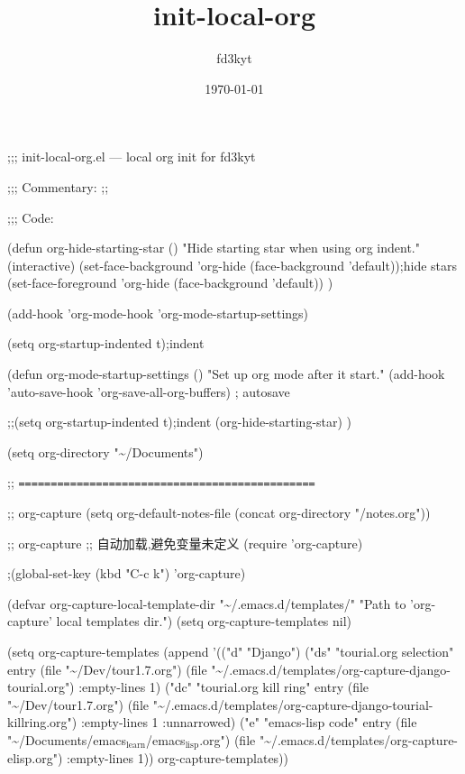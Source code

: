 \documentclass[11pt]{article}
\author{fd3kyt}
\date{\today}
\title{init-local-org}
\begin{document}
\maketitle
\tableofcontents

;;; init-local-org.el --- local org init for fd3kyt

;;; Commentary:
;;


;;; Code:

(defun org-hide-starting-star ()
  "Hide starting star when using org indent."
  (interactive)
  (set-face-background 'org-hide (face-background 'default));hide stars
  (set-face-foreground 'org-hide (face-background 'default))
  )

(add-hook 'org-mode-hook 'org-mode-startup-settings)

(setq org-startup-indented t);indent

(defun org-mode-startup-settings ()
  "Set up org mode after it start."
  (add-hook 'auto-save-hook 'org-save-all-org-buffers) ; autosave

;;(setq org-startup-indented t);indent
(org-hide-starting-star)
)



(setq org-directory "\textasciitilde{}/Documents")


;; \texttt{==============================================}


;; org-capture
(setq org-default-notes-file (concat org-directory "/notes.org"))

;; org-capture
;; 自动加载,避免变量未定义
(require 'org-capture)

;(global-set-key (kbd "C-c k") 'org-capture)

(defvar org-capture-local-template-dir "\textasciitilde{}/.emacs.d/templates/"
  "Path to 'org-capture' local templates dir.")
(setq org-capture-templates nil)

(setq org-capture-templates
      (append '(("d" "Django")
                ("ds" "tourial.org selection" entry
                 (file "\textasciitilde{}/Dev/tour1.7.org")
                 (file "\textasciitilde{}/.emacs.d/templates/org-capture-django-tourial.org")
 :empty-lines 1)
("dc" "tourial.org kill ring" entry
 (file "\textasciitilde{}/Dev/tour1.7.org")
 (file "\textasciitilde{}/.emacs.d/templates/org-capture-django-tourial-killring.org")
 :empty-lines 1 :unnarrowed)
("e" "emacs-lisp code" entry
 (file "\textasciitilde{}/Documents/emacs$_{\text{learn}}$/emacs$_{\text{lisp}}$.org")
 (file "\textasciitilde{}/.emacs.d/templates/org-capture-elisp.org")
   :empty-lines 1))
org-capture-templates))
\end{document}
